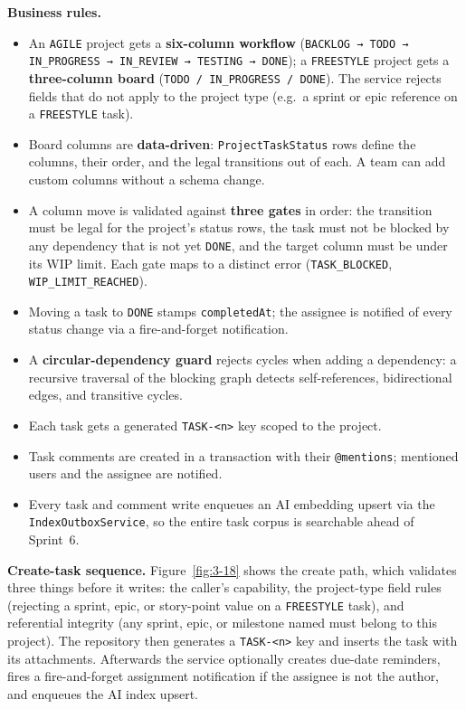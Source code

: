 \textbf{Business rules.}
\begin{itemize}
  \item An \texttt{AGILE} project gets a \textbf{six-column workflow}
    (\texttt{BACKLOG → TODO → IN\_PROGRESS → IN\_REVIEW → TESTING → DONE}); a \texttt{FREESTYLE}
    project gets a \textbf{three-column board} (\texttt{TODO / IN\_PROGRESS / DONE}). The service
    rejects fields that do not apply to the project type (e.g.\ a sprint or epic reference on a
    \texttt{FREESTYLE} task).
  \item Board columns are \textbf{data-driven}: \texttt{ProjectTaskStatus} rows define the columns,
    their order, and the legal transitions out of each. A team can add custom columns without a
    schema change.
  \item A column move is validated against \textbf{three gates} in order: the transition must be
    legal for the project's status rows, the task must not be blocked by any dependency that is not
    yet \texttt{DONE}, and the target column must be under its WIP limit. Each gate maps to a
    distinct error (\texttt{TASK\_BLOCKED}, \texttt{WIP\_LIMIT\_REACHED}).
  \item Moving a task to \texttt{DONE} stamps \texttt{completedAt}; the assignee is notified of
    every status change via a fire-and-forget notification.
  \item A \textbf{circular-dependency guard} rejects cycles when adding a dependency: a recursive
    traversal of the blocking graph detects self-references, bidirectional edges, and transitive
    cycles.
  \item Each task gets a generated \texttt{TASK-<n>} key scoped to the project.
  \item Task comments are created in a transaction with their \texttt{@mentions}; mentioned users
    and the assignee are notified.
  \item Every task and comment write enqueues an AI embedding upsert via the
    \texttt{IndexOutboxService}, so the entire task corpus is searchable ahead of Sprint~6.
\end{itemize}

\textbf{Create-task sequence.} Figure~\ref{fig:3-18} shows the create path, which validates
three things before it writes: the caller's capability, the project-type field rules (rejecting a
sprint, epic, or story-point value on a \texttt{FREESTYLE} task), and referential integrity (any
sprint, epic, or milestone named must belong to this project). The repository then generates a
\texttt{TASK-<n>} key and inserts the task with its attachments. Afterwards the service optionally
creates due-date reminders, fires a fire-and-forget assignment notification if the assignee is
not the author, and enqueues the AI index upsert.

